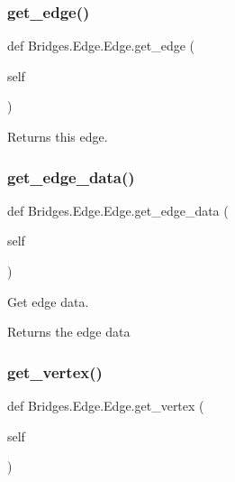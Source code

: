 \subsubsection{\texorpdfstring{get\+\_\+edge()}{get\_edge()}}
{\footnotesize\ttfamily def Bridges.\+Edge.\+Edge.\+get\+\_\+edge (\begin{DoxyParamCaption}\item[{}]{self }\end{DoxyParamCaption})}



Returns this edge. 

\mbox{\label{class_bridges_1_1_edge_1_1_edge_a5820f67d43e270bae8295683cf1d548f}} 
\subsubsection{\texorpdfstring{get\+\_\+edge\+\_\+data()}{get\_edge\_data()}}
{\footnotesize\ttfamily def Bridges.\+Edge.\+Edge.\+get\+\_\+edge\+\_\+data (\begin{DoxyParamCaption}\item[{}]{self }\end{DoxyParamCaption})}



Get edge data. 

\begin{DoxyReturn}{Returns}
the edge data 
\end{DoxyReturn}
\mbox{\label{class_bridges_1_1_edge_1_1_edge_a18be7a83a15e5d9d0f49cb8226dddde0}} 
\subsubsection{\texorpdfstring{get\+\_\+vertex()}{get\_vertex()}}
{\footnotesize\ttfamily def Bridges.\+Edge.\+Edge.\+get\+\_\+vertex (\begin{DoxyParamCaption}\item[{}]{self }\end{DoxyParamCaption})}




